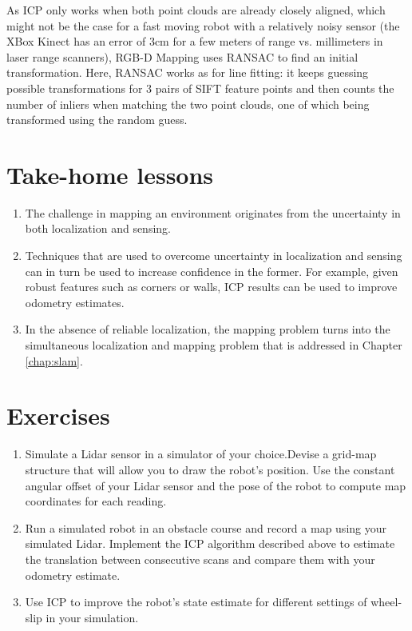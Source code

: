 As ICP only works when both point clouds are already closely aligned, which might not be the case for a fast moving robot with a relatively noisy sensor (the XBox Kinect has an error of 3cm for a few meters of range vs. millimeters in laser range scanners), RGB-D Mapping uses RANSAC to find an initial transformation. Here, RANSAC works as for line fitting: it keeps guessing possible transformations for 3 pairs of SIFT feature points and then counts the number of inliers when matching the two point clouds, one of which being transformed using the random guess.


\section*{Take-home lessons}
\begin{enumerate}
\item The challenge in mapping an environment originates from the uncertainty in both localization and sensing.
\item Techniques that are used to overcome uncertainty in localization and sensing can in turn be used to increase confidence in the former. For example, given robust features such as corners or walls, ICP results can be used to improve odometry estimates.
\item In the absence of reliable localization, the mapping problem turns into the simultaneous localization and mapping problem that is addressed in Chapter \ref{chap:slam}.
\end{enumerate}

\section*{Exercises}
\begin{enumerate}
\item Simulate a Lidar sensor in a simulator of your choice.Devise a grid-map structure that will allow you to draw the robot's position. Use the constant angular offset of your Lidar sensor and the pose of the robot to compute map coordinates for each reading.
\item Run a simulated robot in an obstacle course and record a map using your simulated Lidar. Implement the ICP algorithm described above to estimate the translation between consecutive scans and compare them with your odometry estimate. 
\item Use ICP to improve the robot's state estimate for different settings of wheel-slip in your simulation.  
\end{enumerate}

